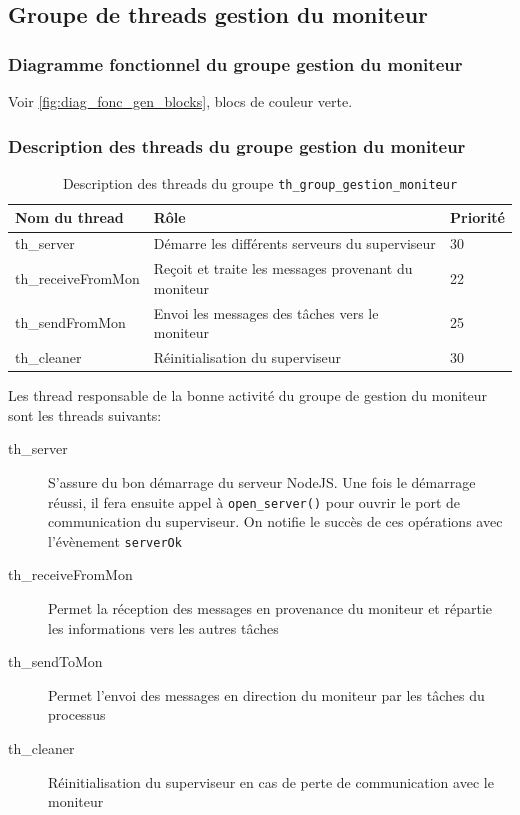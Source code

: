 \documentclass[11pt, a4paper]{paper}
\begin{document}
\subsection{Groupe de threads gestion du moniteur}

\subsubsection{Diagramme fonctionnel du groupe gestion du moniteur}
Voir \ref{fig:diag_fonc_gen_blocks}, {\color{green} blocs de couleur verte}.

\subsubsection{Description des threads du groupe gestion du moniteur}

\begin{table}[htp]
\begin{center}
\begin{tabular}{|p{4cm}|p{8.5cm}|p{2cm}|}
\hline
\bf Nom du thread &	\bf Rôle &	\bf Priorité \\
\hline
\hline

th\_server & Démarre les différents serveurs du superviseur &	30\\
\hline

th\_receiveFromMon & Reçoit et traite les messages provenant du moniteur  &	22\\
\hline

th\_sendFromMon & Envoi les messages des tâches vers le moniteur &	25\\
\hline

th\_cleaner &   Réinitialisation du superviseur &	30\\
\hline

\end{tabular}
\end{center}
\caption{Description des threads du groupe {\tt th\_group\_gestion\_moniteur}}
\label{tab:gt_moniteur}
\end{table}%

Les thread responsable de la bonne activité du groupe de gestion du moniteur sont les threads suivants:
\begin{description}
\item[th\_server] S'assure du bon démarrage du serveur NodeJS. Une fois le démarrage réussi, il fera ensuite appel à {\tt open\_server()} pour ouvrir le port de communication du superviseur. On notifie le succès de ces opérations avec l'évènement {\tt serverOk}
\item[th\_receiveFromMon] Permet la réception des messages en provenance du moniteur et répartie les informations vers les autres tâches
\item[th\_sendToMon] Permet l'envoi des messages en direction du moniteur par les tâches du processus
\item[th\_cleaner] Réinitialisation du superviseur en cas de perte de communication avec le moniteur
\end{description}
\end{document}

